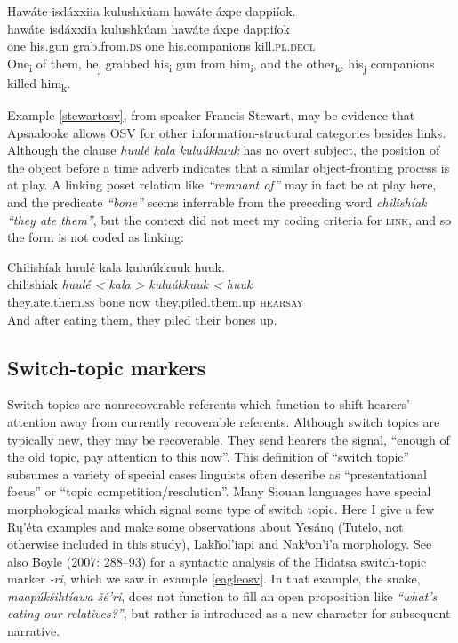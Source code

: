 \documentclass[output=paper]{LSP/langsci}
\begin{document}
\ea\label{apsaalookeosv}
	Hawáte isdáxxiia kulushkúam hawáte áxpe dappiíok.\\
\gll	hawáte 	isdáxxiia 	kulushkúam			hawáte 	áxpe 			dappiíok\\
	one 		his.gun 	grab.from.\textsc{ds} 	one 		his.companions	kill.\textsc{pl.decl}\\
\glt	One\textsubscript{i} of them, he\textsubscript{j} grabbed his\textsubscript{i} gun from him\textsubscript{i}, and the other\textsubscript{k}, his\textsubscript{j} companions killed him\textsubscript{k}.
\z

Example \ref{stewartosv}, from speaker Francis Stewart, may be evidence that Apsaalooke allows OSV for other information-structural categories besides links. Although the clause \emph{huulé kala kuluúkkuuk} has no overt subject, the position of the object before a time adverb indicates that a similar object-fronting process is at play. A linking poset relation like \emph{“remnant of”} may in fact be at play here, and the predicate \emph{“bone”} seems inferrable from the preceding word \emph{chilishíak “they ate them”}, but the context did not meet my coding criteria for \textsc{link}, and so the form is not coded as linking:

\ea\label{stewartosv}
Chilishíak huulé kala kuluúkkuuk huuk.\footnotemark\\
\gll	chilishíak 				\emph{huulé <}	\emph{kala >}	\emph{kuluúkkuuk <}	\emph{huuk}\\
	they.ate.them.\textsc{ss} 	bone 			now 			they.piled.them.up 		\textsc{hearsay}\\
\glt	And after eating them, they piled their bones up.
\z

\subsection{Switch-topic markers}\label{switchtopic}

	Switch topics are nonrecoverable referents which function to shift hearers’ attention away from currently recoverable referents. Although switch topics are typically new, they may be recoverable. They send hearers the signal, “enough of the old topic, pay attention to this now”. This definition of “switch topic” subsumes a variety of special cases linguists often describe as “presentational focus” or “topic competition/resolution”. Many Siouan languages have special morphological marks which signal some type of switch topic. Here I give a few Rų’éta examples and make some observations about Yesánq (Tutelo, not otherwise included in this study), Lakȟol’iapi and Nakʰon’i’a morphology. See also Boyle (2007: 288--93) for a syntactic analysis of the Hidatsa switch-topic marker \emph{-ri}, which we saw in example \ref{eagleosv}. In that example, the snake, \emph{maapúkšihtíawa šé’ri}, does not function to fill an open proposition like \emph{“what’s eating our relatives?”}, but rather is introduced as a new character for subsequent narrative.
	
\end{document}
